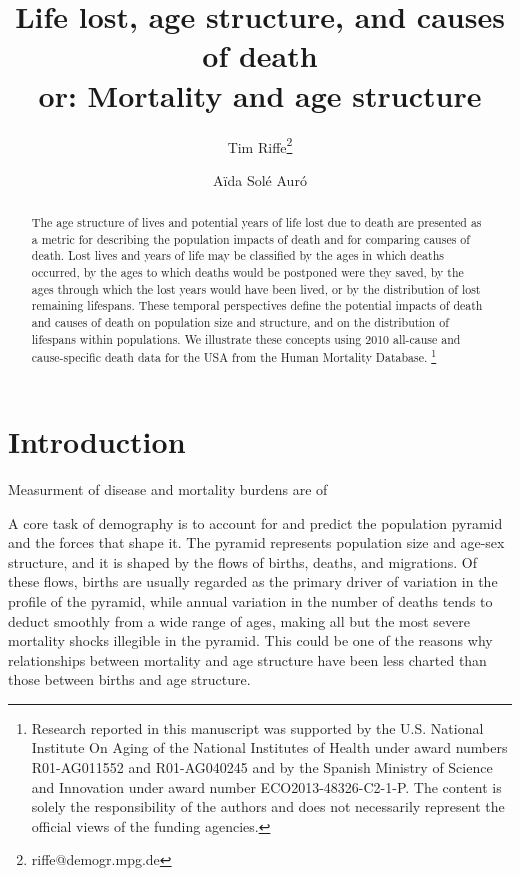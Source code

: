 \documentclass{article}
\newcommand\ackn[1]{%
  \begingroup
  \renewcommand\thefootnote{}\footnote{#1}%
  \addtocounter{footnote}{-1}%
  \endgroup
}
\begin{document}
\title{Life lost, age structure, and causes of death\\ or: Mortality and age
structure}

\author[1]{Tim Riffe\thanks{riffe@demogr.mpg.de}}
\author[2]{A{\"i}da Sol\'{e} Aur\'{o}}

\maketitle

% 
\begin{abstract}
The age structure of lives and potential years of life lost due to death are
presented as a metric for describing the population impacts of death and for comparing causes of death. Lost lives and years of life may be classified by the ages in which
deaths occurred, by the ages to which deaths would be postponed were they saved, by the
ages through which the lost years would have been lived, or by the distribution of
lost remaining lifespans. These temporal perspectives define the
potential impacts of death and causes of death on population size and structure,
and on the distribution of lifespans within populations. We
illustrate these concepts using 2010 all-cause and cause-specific death
data for the USA from the Human Mortality Database. \ackn{Research reported in this manuscript
was supported by the U.S.
National Institute On Aging of the National Institutes of Health under award numbers R01-AG011552 and R01-AG040245 and by the Spanish Ministry of Science and Innovation under award
number ECO2013-48326-C2-1-P. The content is solely the responsibility of the
authors and does not necessarily represent the official views of the funding
agencies.}
\end{abstract}

\section*{Introduction}
Measurment of disease and mortality burdens are of 


A core task of demography is to account for and predict the population
pyramid and the forces that shape it. The pyramid represents population
size and age-sex structure, and it is shaped by the flows of births,
deaths, and migrations. Of these flows, births are usually regarded
as the primary driver of variation in the profile of the pyramid, while annual
variation in the number of deaths tends to deduct smoothly from a wide range of ages, making all but the most severe mortality shocks illegible in the pyramid. This could be one of the
reasons why relationships between mortality and age structure have been less charted than those between births and age structure.
\end{document}
